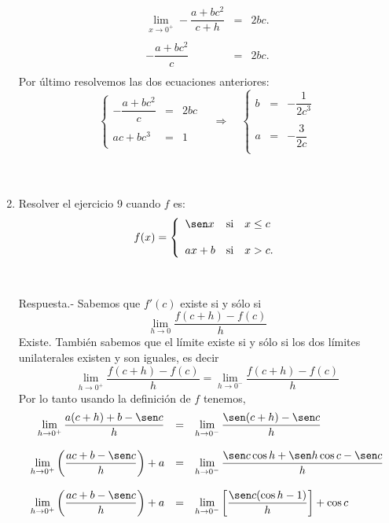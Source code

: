 \begin{enumerate}[\bfseries 1.]
$$\begin{array}{rcl}
	    \lim\limits_{x\to 0^+}-\dfrac{a+bc^2}{c+h}&=&2bc.\\\\
	    -\dfrac{a+bc^2}{c}&=&2bc.\\
	\end{array}$$
	Por último resolvemos las dos ecuaciones anteriores:
	$$\left\{\begin{array}{rcl}
		-\dfrac{a+bc^2}{c}&=&2bc\\\\
			   ac+bc^3&=&1\\
	\end{array}\right.
	\quad \Rightarrow \quad 
	\left\{\begin{array}{rcl}
		b &=& -\dfrac{1}{2c^3}\\\\
		a &=& -\dfrac{3}{2c}\\
	    \end{array}\right.$$\\\\

    \item Resolver el ejercicio 9 cuando $f$ es:
    $$f(x)=\left\{\begin{array}{lcl}
	\sen x &\mbox{si}&x\leq c\\\\
	ax+b &\mbox{si}&x>c.\\
    \end{array}\right.$$\\\\
	Respuesta.-\; Sabemos que $f'(c)$ existe si y sólo si 
	$$\lim_{h\to 0}\dfrac{f(c+h)-f(c)}{h}$$
	Existe. También sabemos que el límite existe si y sólo si los dos límites unilaterales existen y son iguales, es decir
	$$\lim_{h\to 0^+}\dfrac{f(c+h)-f(c)}{h}=\lim_{h\to 0^-}\dfrac{f(c+h)-f(c)}{h}$$
	Por lo tanto usando la definición de $f$ tenemos,
	$$\begin{array}{rcl}
	    \lim\limits_{h\to 0^+} \dfrac{a(c+h)+b-\sen c}{h} &=& \lim\limits_{h\to 0^-} \dfrac{\sen (c+h)-\sen c}{h} \\\\
	    \lim\limits_{h\to 0^+} \left(\dfrac{ac + b-\sen c}{h}\right)+a &=& \lim\limits_{h\to 0^-} \dfrac{\sen c \cos h + \sen h \cos c - \sen c}{h}\\\\
	    \lim\limits_{h\to 0^+} \left(\dfrac{ac + b-\sen c}{h}\right)+a &=& \lim\limits_{h\to 0^-} \left[\dfrac{\sen c ( \cos h -1)}{h}\right] + \cos c \\\\
	\end{array}$$


\end{enumerate}
